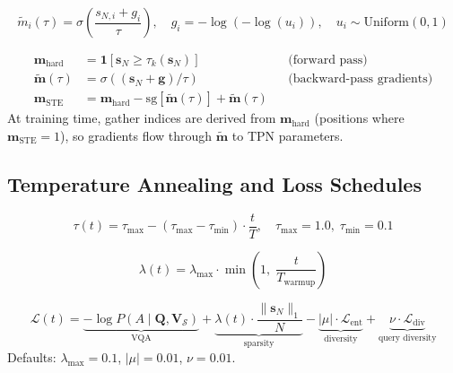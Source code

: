 \documentclass[11pt,a4paper]{article}
\newcommand{\sg}[1]{\mathrm{sg}\!\left[#1\right]}
\newcommand{\vm}{\mathbf{m}}
\newcommand{\vs}{\mathbf{s}}
\newcommand{\mQ}{\mathbf{Q}}
\newcommand{\mV}{\mathbf{V}}
\begin{document}
\begin{definitionbox}[title={Gumbel-Sigmoid Soft Mask}]
\begin{equation}
  \tilde{m}_i(\tau)
    = \sigma\!\left(\frac{s_{N,i} + g_i}{\tau}\right), \quad
  g_i = -\log(-\log(u_i)), \quad u_i \sim \text{Uniform}(0,1)
  \label{eq:gumbel_sigmoid}
\end{equation}
\end{definitionbox}

\begin{definitionbox}[title={Straight-Through Estimator for Top-$k$}]
\begin{align}
  \vm_{\text{hard}} &= \mathbf{1}[\vs_N \geq \tau_k(\vs_N)]
    && \text{(forward pass)} \\
  \tilde{\vm}(\tau) &= \sigma((\vs_N + \mathbf{g})/\tau)
    && \text{(backward-pass gradients)} \\
  \vm_{\text{STE}} &= \vm_{\text{hard}} - \sg{\tilde{\vm}(\tau)} + \tilde{\vm}(\tau)
    \label{eq:ste}
\end{align}
At training time, gather indices are derived from $\vm_{\text{hard}}$
(positions where $\vm_{\text{STE}} = 1$), so gradients flow through
$\tilde{\vm}$ to TPN parameters.
\end{definitionbox}

\subsection{Temperature Annealing and Loss Schedules}

\begin{equation}
  \tau(t) = \tau_{\max} - (\tau_{\max} - \tau_{\min}) \cdot \frac{t}{T},
  \quad \tau_{\max}{=}1.0,\; \tau_{\min}{=}0.1
\end{equation}

\begin{equation}
  \lambda(t) = \lambda_{\max} \cdot \min\!\left(1,\;\frac{t}{T_{\text{warmup}}}\right)
\end{equation}

\begin{definitionbox}[title={Full Training Loss}]
\begin{equation}
  \mathcal{L}(t) =
    \underbrace{-\log P(A \mid \mQ, \mV_\mathcal{S})}_{\text{VQA}}
    + \underbrace{\lambda(t) \cdot \frac{\|\vs_N\|_1}{N}}_{\text{sparsity}}
    - \underbrace{|\mu| \cdot \mathcal{L}_{\text{ent}}}_{\text{diversity}}
    + \underbrace{\nu \cdot \mathcal{L}_{\text{div}}}_{\text{query diversity}}
  \label{eq:total_loss}
\end{equation}
Defaults: $\lambda_{\max}{=}0.1$, $|\mu|{=}0.01$, $\nu{=}0.01$.
\end{definitionbox}
\end{document}
